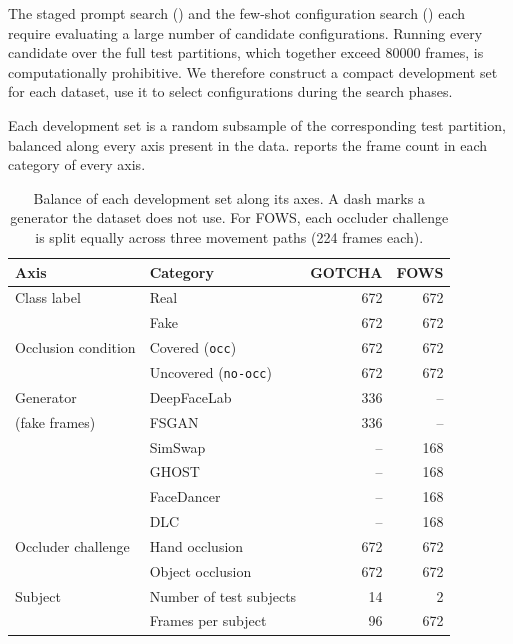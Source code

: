 The staged prompt search () and the few-shot configuration search () each require evaluating a large number of candidate configurations. Running every candidate over the full test partitions, which together exceed \num{80000} frames, is computationally prohibitive. We therefore construct a compact development set for each dataset, use it to select configurations during the search phases.

Each development set is a random subsample of the corresponding test partition, balanced along every axis present in the data.  reports the frame count in each category of every axis.

\begin{table}[t]
	\centering
	\caption{Balance of each development set along its axes. A dash marks a generator the dataset does not use. For FOWS, each occluder challenge is split equally across three movement paths (\num{224} frames each).}
	\label{tab:devbalance}
	\begin{tabular}{llrr}
		\toprule
		\textbf{Axis} & \textbf{Category} & \textbf{GOTCHA} & \textbf{FOWS} \\
		\midrule
		Class label          & Real                        & \num{672} & \num{672} \\
		                     & Fake                        & \num{672} & \num{672} \\
		\midrule
		Occlusion condition  & Covered (\texttt{occ})      & \num{672} & \num{672} \\
		                     & Uncovered (\texttt{no-occ}) & \num{672} & \num{672} \\
		\midrule
		Generator            & DeepFaceLab & \num{336} & --        \\
		(fake frames)        & FSGAN       & \num{336} & --        \\
		                     & SimSwap     & --        & \num{168} \\
		                     & GHOST       & --        & \num{168} \\
		                     & FaceDancer  & --        & \num{168} \\
		                     & DLC         & --        & \num{168} \\
		\midrule
		Occluder challenge   & Hand occlusion   & \num{672} & \num{672} \\
		                     & Object occlusion & \num{672} & \num{672} \\
		\midrule
		Subject              & Number of test subjects & 14       & 2         \\
		                     & Frames per subject      & \num{96} & \num{672} \\
		\bottomrule
	\end{tabular}
\end{table}


